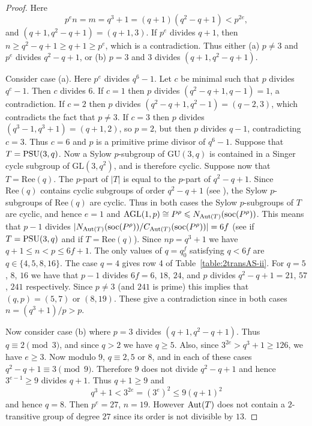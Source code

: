 \documentclass[12pt]{amsart}
\theoremstyle{remark}
\theoremstyle{definition}
\newcommand{\soc}{\mathrm{soc}}
\newcommand{\GL}{\mathrm{GL}}
\newcommand{\AGL}{\mathrm{AGL}}
\newcommand{\PSU}{\textnormal{PSU}}
\newcommand{\aut}{\textnormal{Aut}}
\begin{document}
\begin{proof}
Here
	\[ p^e n = m = q^3 + 1 = (q+1)(q^2-q+1) < p^{2e}, \]
and $(q+1, q^2-q+1) = (q+1, 3)$.  If  $p^e$ divides $q+1$, then $n \geqslant q^2-q+1 \geqslant q+1 \geqslant p^e$, which is a contradiction. 
Thus either (a) $p \ne 3$ and $p^e$ divides $q^2-q+1$, or (b) $p = 3$ and $3$ divides $(q+1, q^2-q+1)$. 

Consider case (a). Here $p^e$ divides $q^6 - 1$. Let $c$ be minimal such that $p$ divides $q^c- 1$. Then $c$ divides $6$. If $c = 1$ then $p$ divides $(q^2-q+1, q-1) = 1$, a contradiction. If $c = 2$ then $p$ divides $(q^2-q+1, q^2-1) = (q-2,3)$, which contradicts the fact that $p \ne 3$. If $c = 3$ then $p$ divides $(q^3-1, q^3+1) = (q+1, 2)$, so $p = 2$, but then $p$ divides $q - 1$, contradicting $c = 3$. Thus $c = 6$ and $p$ is a primitive prime divisor of $q^6-1$.  Suppose that $T=\PSU(3,q)$. Now  a Sylow $p$-subgroup of $\mathrm{GU}(3,q)$ is contained in a Singer cycle subgroup of $\GL(3,q^2)$, and is therefore cyclic. Suppose now that $T = \mathrm{Ree}(q)$. The $p$-part of $|T|$ is equal to the $p$-part of $q^2-q+1$. Since $\mathrm{Ree}(q)$ contains cyclic subgroups of  order $q^2-q+1$ (see \cite{kleidman2g2}), the Sylow $p$-subgroups of $\mathrm{Ree}(q)$ are cyclic. Thus in both cases the Sylow $p$-subgroups of $T$ are cyclic, and hence $e = 1$ and $\AGL(1,p) \cong P^\rho \leqslant N_{\aut(T)}(\soc(P^\rho))$. This means that $p-1$ divides $|N_{\aut(T)}(\soc(P^\rho))/C_{\aut(T)}(\soc(P^\rho))| = 6f$  (see \cite[Table 8.5]{BHRD} if $T=\PSU(3,q)$ and \cite[Theorem C]{kleidman2g2} if $T=\mathrm{Ree}(q)$).  Since $np = q^3+1$ we have $q+1 \leqslant n < p \leqslant 6f+1$. The only values of $q = q_0^f$ satisfying $q < 6f$ are $q \in \{4,5,8,16\}$.  The case $q = 4$ gives row 4 of Table~\ref{table:2transAS-ii}. For $q = 5$, $8$, $16$ we have that $p-1$ divides $6f = 6$, $18$, $24$, and $p$ divides $q^2-q+1 = 21$, $57$, $241$ respectively. Since $p \ne 3$ (and $241$ is prime) this implies that $(q,p) = (5,7)$ or $(8, 19)$. These give a contradiction since in both cases $n = (q^3+1)/p > p$.

Now consider case (b) where $p = 3$ divides $(q+1, q^2-q+1)$. Thus $q \equiv 2\pmod{3}$, and since $q > 2$ we have $q \geqslant 5$. Also, since $3^{2e} > q^3+1 \geqslant 126$, we have $e \geqslant 3$. Now modulo $9$, $q \equiv 2, 5$ or $8$, and in each of these cases $q^2-q+1 \equiv 3\pmod{9}$.  Therefore $9$ does not divide $q^2-q+1$ and hence $3^{e-1} \geqslant 9$ divides $q+1$. Thus $q+1\geqslant 9$ and 
	\[ q^3+1 < 3^{2e} = (3^e)^2 \leqslant 9(q+1)^2 \]
and hence $q = 8$. Then $p^e = 27$, $n = 19$. However $\aut(T)$ does not contain a $2$-transitive group of degree $27$ since its order is not divisible by $13$. 
\end{proof}
\end{document}
